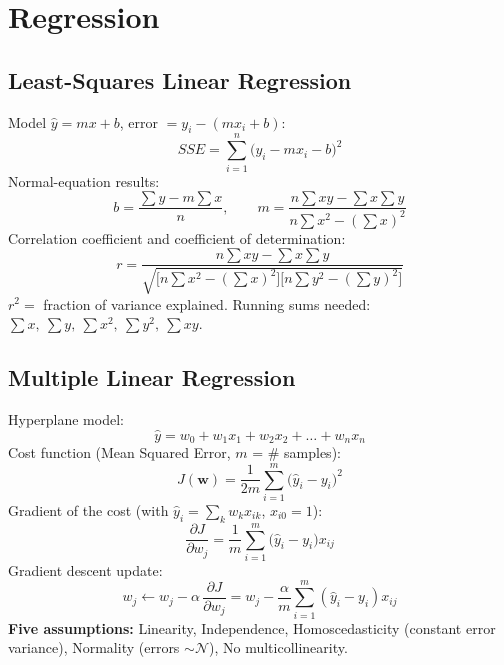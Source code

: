 \section{Regression}

\subsection{Least-Squares Linear Regression}
\begin{formulabox}
Model $\hat y = mx+b$, error $= y_i - (mx_i+b)$:
\[
SSE = \sum_{i=1}^n \big(y_i - m x_i - b\big)^2
\]
Normal-equation results:
\[
b = \frac{\sum y - m\sum x}{n}, \qquad
m = \frac{n\sum xy - \sum x \sum y}{n\sum x^2 - \left(\sum x\right)^2}
\]
Correlation coefficient and coefficient of determination:
\[
r = \frac{n\sum xy - \sum x\sum y}{\sqrt{\big[n\sum x^2-(\sum x)^2\big]\big[n\sum y^2-(\sum y)^2\big]}}
\]
$r^2 = $ fraction of variance explained.
Running sums needed: $\sum x,\ \sum y,\ \sum x^2,\ \sum y^2,\ \sum xy$.
\end{formulabox}

\subsection{Multiple Linear Regression}
\begin{formulabox}
Hyperplane model:
\[
\hat y = w_0 + w_1 x_1 + w_2 x_2 + \dots + w_n x_n
\]
Cost function (Mean Squared Error, $m$ = \# samples):
\[
J(\mathbf w) = \frac{1}{2m}\sum_{i=1}^m \big(\hat y_i - y_i\big)^2
\]
Gradient of the cost (with $\hat y_i = \sum_k w_k x_{ik}$, $x_{i0}=1$):
\[
\frac{\partial J}{\partial w_j} = \frac{1}{m}\sum_{i=1}^m \big(\hat y_i - y_i\big)x_{ij}
\]
Gradient descent update:
\[
w_j \leftarrow w_j - \alpha\,\frac{\partial J}{\partial w_j} = w_j - \frac{\alpha}{m}\sum_{i=1}^m (\hat y_i - y_i)x_{ij}
\]
\textbf{Five assumptions:} Linearity, Independence, Homoscedasticity (constant error variance), Normality (errors $\sim \mathcal N$), No multicollinearity.
\end{formulabox}
